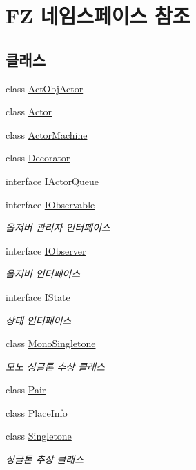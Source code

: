 \hypertarget{namespace_f_z}{}\section{FZ 네임스페이스 참조}
\label{namespace_f_z}
\subsection*{클래스}
\begin{DoxyCompactItemize}
\item 
class \hyperlink{class_f_z_1_1_act_obj_actor}{Act\+Obj\+Actor}
\item 
class \hyperlink{class_f_z_1_1_actor}{Actor}
\item 
class \hyperlink{class_f_z_1_1_actor_machine}{Actor\+Machine}
\item 
class \hyperlink{class_f_z_1_1_decorator}{Decorator}
\item 
interface \hyperlink{interface_f_z_1_1_i_actor_queue}{I\+Actor\+Queue}
\item 
interface \hyperlink{interface_f_z_1_1_i_observable}{I\+Observable}
\begin{DoxyCompactList}\small\item\em 옵저버 관리자 인터페이스 \end{DoxyCompactList}\item 
interface \hyperlink{interface_f_z_1_1_i_observer}{I\+Observer}
\begin{DoxyCompactList}\small\item\em 옵저버 인터페이스 \end{DoxyCompactList}\item 
interface \hyperlink{interface_f_z_1_1_i_state}{I\+State}
\begin{DoxyCompactList}\small\item\em 상태 인터페이스 \end{DoxyCompactList}\item 
class \hyperlink{class_f_z_1_1_mono_singletone}{Mono\+Singletone}
\begin{DoxyCompactList}\small\item\em 모노 싱글톤 추상 클래스 \end{DoxyCompactList}\item 
class \hyperlink{class_f_z_1_1_pair}{Pair}
\item 
class \hyperlink{class_f_z_1_1_place_info}{Place\+Info}
\item 
class \hyperlink{class_f_z_1_1_singletone}{Singletone}
\begin{DoxyCompactList}\small\item\em 싱글톤 추상 클래스 \end{DoxyCompactList}\item 

\end{DoxyCompactItemize}
